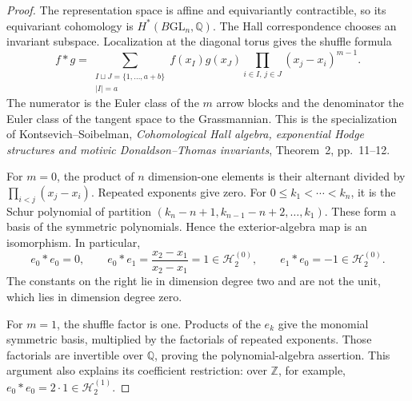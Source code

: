 \begin{proof}
The representation space is affine and equivariantly contractible,
so its equivariant cohomology is $H^*(B\mathrm{GL}_n,\mathbb Q)$.
The Hall correspondence chooses an invariant subspace. Localization
at the diagonal torus gives the shuffle formula
\begin{equation}
 f*g=\sum_{\substack{I\sqcup J=\{1,\ldots,a+b\}\\|I|=a}}
 f(x_I)g(x_J)\prod_{i\in I,\,j\in J}(x_j-x_i)^{m-1}.
 \label{v4-arith:ks:one-vertex-shuffle}
\end{equation}
The numerator is the Euler class of the $m$ arrow blocks and the
denominator the Euler class of the tangent space to the Grassmannian.
This is the specialization of Kontsevich--Soibelman,
\emph{Cohomological Hall algebra, exponential Hodge structures and
motivic Donaldson--Thomas invariants}, Theorem~2, pp.~11--12.

For $m=0$, the product of $n$ dimension-one elements is their
alternant divided by $\prod_{i<j}(x_j-x_i)$. Repeated exponents give
zero. For $0\leq k_1<\cdots<k_n$, it is the Schur polynomial of
partition $(k_n-n+1,k_{n-1}-n+2,\ldots,k_1)$. These form a basis of
the symmetric polynomials. Hence the exterior-algebra map is an
isomorphism. In particular,
\[
 e_0*e_0=0,\qquad
 e_0*e_1=\frac{x_2-x_1}{x_2-x_1}=1\in\mathcal H^{(0)}_2,
 \qquad e_1*e_0=-1\in\mathcal H^{(0)}_2.
\]
The constants on the right lie in dimension degree two and are not
the unit, which lies in dimension degree zero.

For $m=1$, the shuffle factor is one. Products of the $e_k$ give the
monomial symmetric basis, multiplied by the factorials of repeated
exponents. Those factorials are invertible over $\mathbb Q$, proving
the polynomial-algebra assertion. This argument also explains its
coefficient restriction: over $\mathbb Z$, for example,
$e_0*e_0=2\cdot1\in\mathcal H^{(1)}_2$.
\end{proof}

